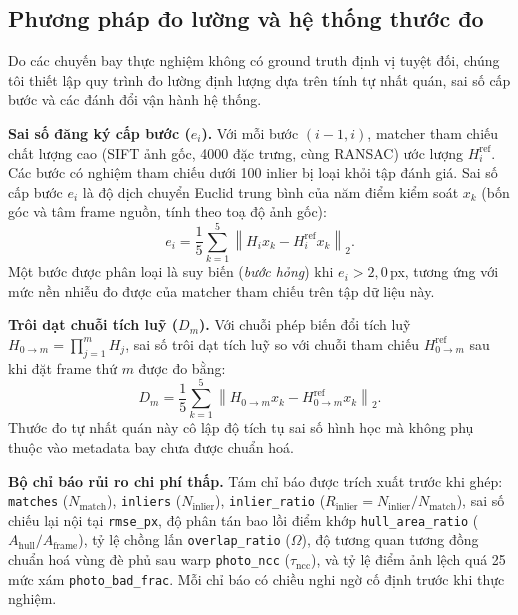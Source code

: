 \documentclass[conference]{IEEEtran}
\begin{document}
\subsection{Phương pháp đo lường và hệ thống thước đo}
Do các chuyến bay thực nghiệm không có ground truth định vị tuyệt đối, chúng tôi
thiết lập quy trình đo lường định lượng dựa trên tính tự nhất quán, sai số cấp bước
và các đánh đổi vận hành hệ thống.

\textbf{Sai số đăng ký cấp bước ($e_i$).} Với mỗi bước $(i-1, i)$, matcher tham chiếu
chất lượng cao (SIFT ảnh gốc, 4000 đặc trưng, cùng RANSAC) ước lượng $H_i^{\mathrm{ref}}$.
Các bước có nghiệm tham chiếu dưới 100 inlier bị loại khỏi tập đánh giá. Sai số cấp
bước $e_i$ là độ dịch chuyển Euclid trung bình của năm điểm kiểm soát $x_k$ (bốn góc
và tâm frame nguồn, tính theo toạ độ ảnh gốc):
\begin{equation}
e_i = \frac{1}{5}\sum_{k=1}^{5}
\left\| H_i x_k - H_i^{\mathrm{ref}} x_k \right\|_2 .
\label{eq:step_error_vi}
\end{equation}
Một bước được phân loại là suy biến (\emph{bước hỏng}) khi $e_i > 2{,}0$\,px, tương
ứng với mức nền nhiễu đo được của matcher tham chiếu trên tập dữ liệu này.

\textbf{Trôi dạt chuỗi tích luỹ ($D_m$).} Với chuỗi phép biến đổi tích luỹ
$H_{0\to m} = \prod_{j=1}^m H_j$, sai số trôi dạt tích luỹ so với chuỗi tham chiếu
$H_{0\to m}^{\mathrm{ref}}$ sau khi đặt frame thứ $m$ được đo bằng:
\begin{equation}
D_m = \frac{1}{5}\sum_{k=1}^{5}
\left\| H_{0\to m} x_k - H_{0\to m}^{\mathrm{ref}} x_k \right\|_2 .
\label{eq:drift_vi}
\end{equation}
Thước đo tự nhất quán này cô lập độ tích tụ sai số hình học mà không phụ thuộc vào
metadata bay chưa được chuẩn hoá.

\textbf{Bộ chỉ báo rủi ro chi phí thấp.} Tám chỉ báo được trích xuất trước khi ghép:
\texttt{matches} ($N_{\mathrm{match}}$), \texttt{inliers} ($N_{\mathrm{inlier}}$),
\texttt{inlier\_ratio} ($R_{\mathrm{inlier}} = N_{\mathrm{inlier}} / N_{\mathrm{match}}$),
sai số chiếu lại nội tại \texttt{rmse\_px}, độ phân tán bao lồi điểm khớp
\texttt{hull\_area\_ratio} ($A_{\mathrm{hull}} / A_{\mathrm{frame}}$), tỷ lệ chồng lấn
\texttt{overlap\_ratio} ($\Omega$), độ tương quan tương đồng chuẩn hoá vùng đè phủ sau
warp \texttt{photo\_ncc} ($\tau_{\mathrm{ncc}}$), và tỷ lệ điểm ảnh lệch quá 25 mức xám
\texttt{photo\_bad\_frac}. Mỗi chỉ báo có chiều nghi ngờ cố định trước khi thực nghiệm.
\end{document}
